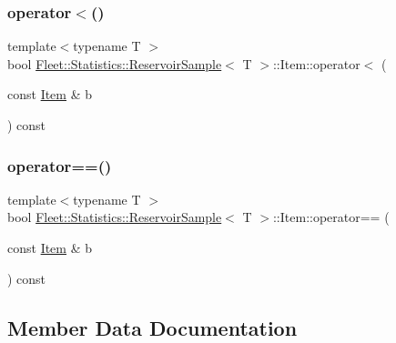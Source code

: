 \subsubsection{\texorpdfstring{operator$<$()}{operator<()}}
{\footnotesize\ttfamily template$<$typename T $>$ \\
bool \hyperlink{class_fleet_1_1_statistics_1_1_reservoir_sample}{Fleet\+::\+Statistics\+::\+Reservoir\+Sample}$<$ T $>$\+::Item\+::operator$<$ (\begin{DoxyParamCaption}\item[{const \hyperlink{class_fleet_1_1_statistics_1_1_reservoir_sample_1_1_item}{Item} \&}]{b }\end{DoxyParamCaption}) const\hspace{0.3cm}{\ttfamily [inline]}}

\mbox{\label{class_fleet_1_1_statistics_1_1_reservoir_sample_1_1_item_ab3adc1f593aec74d7d140f8c3553546e}} 
\subsubsection{\texorpdfstring{operator==()}{operator==()}}
{\footnotesize\ttfamily template$<$typename T $>$ \\
bool \hyperlink{class_fleet_1_1_statistics_1_1_reservoir_sample}{Fleet\+::\+Statistics\+::\+Reservoir\+Sample}$<$ T $>$\+::Item\+::operator== (\begin{DoxyParamCaption}\item[{const \hyperlink{class_fleet_1_1_statistics_1_1_reservoir_sample_1_1_item}{Item} \&}]{b }\end{DoxyParamCaption}) const\hspace{0.3cm}{\ttfamily [inline]}}



\subsection{Member Data Documentation}
\mbox{\label{class_fleet_1_1_statistics_1_1_reservoir_sample_1_1_item_a0037b193d6712481b90416b51f2eb9d5}} 
